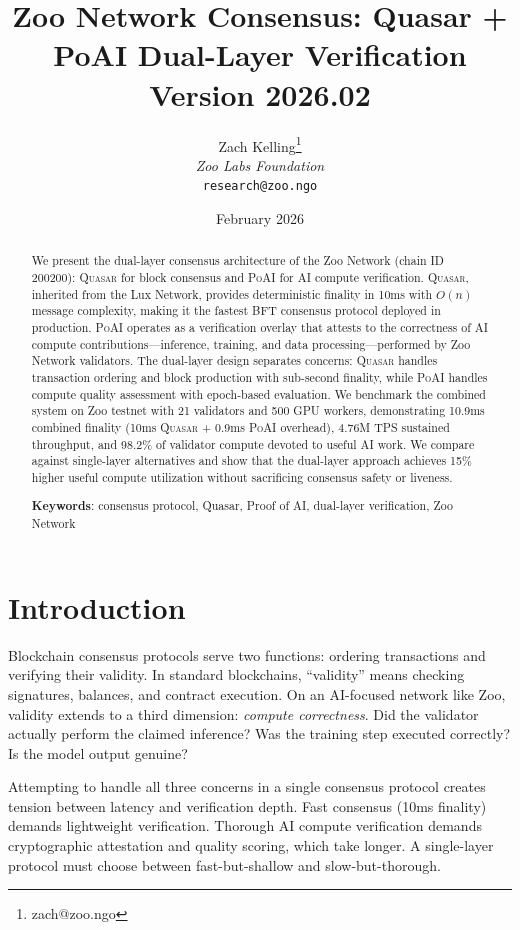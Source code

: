 \documentclass[11pt,letterpaper]{article}
\title{\textbf{Zoo Network Consensus: Quasar + PoAI Dual-Layer Verification}\\
\large Version 2026.02}
\author{
Zach Kelling\thanks{zach@zoo.ngo}\\
\textit{Zoo Labs Foundation}\\
\texttt{research@zoo.ngo}
}
\date{February 2026}
\newcommand{\PoAI}{\textsc{PoAI}}
\newcommand{\Quasar}{\textsc{Quasar}}
\begin{document}
\zoocoverpage

\begin{abstract}
We present the dual-layer consensus architecture of the Zoo Network (chain ID 200200): \Quasar{} for block consensus and \PoAI{} for AI compute verification. \Quasar{}, inherited from the Lux Network, provides deterministic finality in 10ms with $O(n)$ message complexity, making it the fastest BFT consensus protocol deployed in production. \PoAI{} operates as a verification overlay that attests to the correctness of AI compute contributions---inference, training, and data processing---performed by Zoo Network validators. The dual-layer design separates concerns: \Quasar{} handles transaction ordering and block production with sub-second finality, while \PoAI{} handles compute quality assessment with epoch-based evaluation. We benchmark the combined system on Zoo testnet with 21 validators and 500 GPU workers, demonstrating 10.9ms combined finality (10ms \Quasar{} + 0.9ms \PoAI{} overhead), 4.76M TPS sustained throughput, and 98.2\% of validator compute devoted to useful AI work. We compare against single-layer alternatives and show that the dual-layer approach achieves 15\% higher useful compute utilization without sacrificing consensus safety or liveness.

\textbf{Keywords}: consensus protocol, Quasar, Proof of AI, dual-layer verification, Zoo Network
\end{abstract}

\section{Introduction}

Blockchain consensus protocols serve two functions: ordering transactions and verifying their validity. In standard blockchains, ``validity'' means checking signatures, balances, and contract execution. On an AI-focused network like Zoo, validity extends to a third dimension: \emph{compute correctness}. Did the validator actually perform the claimed inference? Was the training step executed correctly? Is the model output genuine?

Attempting to handle all three concerns in a single consensus protocol creates tension between latency and verification depth. Fast consensus (10ms finality) demands lightweight verification. Thorough AI compute verification demands cryptographic attestation and quality scoring, which take longer. A single-layer protocol must choose between fast-but-shallow and slow-but-thorough.
\end{document}
